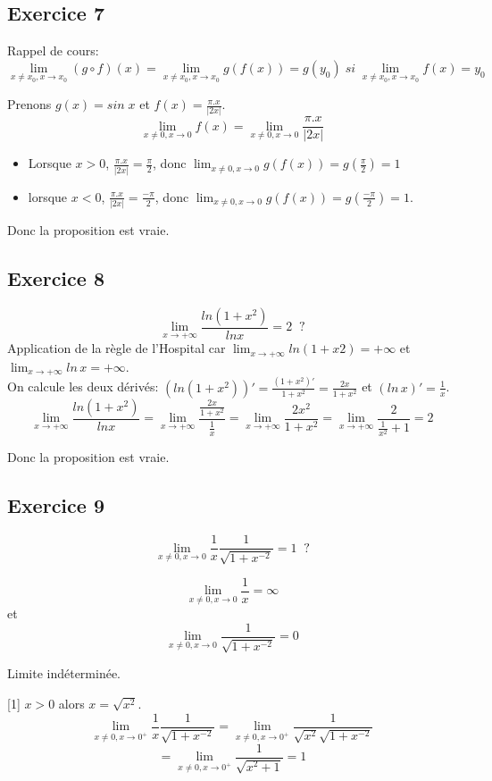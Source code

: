 \documentclass[]{book}
\theoremstyle{definition}
\begin{document}
\subsection*{Exercice 7}
Rappel de cours:
$$\lim_{x \neq x_0, x \to x_0}(g \circ f)(x) = \lim_{x \neq x_0, x \to x_0}g(f(x)) = g(y_0)\; si\; \lim_{x \neq x_0, x \to x_0} f(x) = y_0 $$

Prenons $g(x) = sin\; x$ et $f(x) = \frac{\pi.x}{|2x|}$. 
$$ \lim_{x \neq 0, x \to 0} f(x) = \lim_{x \neq 0, x \to 0} \frac{\pi.x}{|2x|}$$
\begin{itemize}
\item Lorsque $x>0$, $\frac{\pi.x}{|2x|} = \frac{\pi}{2}$, donc $\lim_{x \neq 0, x \to 0} g(f(x)) = g(\frac{\pi}{2}) = 1$ 
\item lorsque $x<0$, $\frac{\pi.x}{|2x|} = \frac{-\pi}{2}$, donc $\lim_{x \neq 0, x \to 0} g(f(x)) = g(\frac{-\pi}{2}) = 1$.
\end{itemize}


Donc la proposition est vraie.


\subsection*{Exercice 8}
$$\lim_{x \to +\infty} \frac{ln(1+x^2)}{ln x} = 2 \;\;?$$
Application de la r\`egle de l'Hospital car $\lim_{x \to +\infty} ln(1+x2) = +\infty$ et $\lim_{x \to +\infty} ln\, x = +\infty$.\\

On calcule les deux d\'eriv\'es: $(ln(1+x^2))' = \frac{(1+x^2)'}{1+x^2} = \frac{2x}{1+x^2}$ et $(ln\, x)' = \frac{1}{x}$.
$$ \lim_{x \to +\infty} \frac{ln(1+x^2)}{ln x} = \lim_{x \to +\infty} \frac{\frac{2x}{1+x^2}}{\frac{1}{x}} = \lim_{x \to +\infty} \frac{2x^2}{1+x^2} = \lim_{x \to +\infty} \frac{2}{\frac{1}{x^2}+1} = 2$$


Donc la proposition est vraie.

\subsection*{Exercice 9}
$$ \lim_{x \neq 0, x \to 0} \frac{1}{x} \frac{1}{\sqrt{1+x^{-2}}}= 1 \;\;?$$

$$\lim_{x \neq 0,x \to 0} \frac{1}{x} = \infty$$
et 
$$\lim_{x \neq 0,x \to 0} \frac{1}{\sqrt{1+x^{-2}}} = 0$$

Limite ind\'etermin\'ee.

[1] $x>0$ alors $x = \sqrt{x^2}$.
$$ \lim_{x \neq 0, x \to 0^{+}} \frac{1}{x} \frac{1}{\sqrt{1+x^{-2}}} = \lim_{x \neq 0, x \to 0^{+}} \frac{1}{\sqrt{x^2}\sqrt{1+x^{-2}}}$$
$$ = \lim_{x \neq 0, x \to 0^{+}} \frac{1}{\sqrt{x^2+1}} = 1$$
\end{document}

